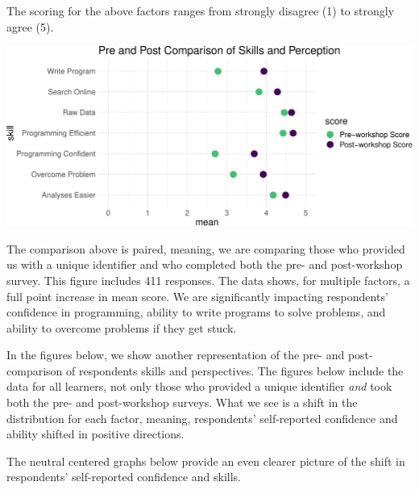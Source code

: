 \documentclass[]{article}
\makeatletter
\def\maxwidth{\ifdim\Gin@nat@width>\linewidth\linewidth\else\Gin@nat@width\fi}
\makeatother
\begin{document}
The scoring for the above factors ranges from strongly disagree (1) to
strongly agree (5).

\includegraphics[width=\maxwidth]{../figures/dc-paired-data-mean-1}

The comparison above is paired, meaning, we are comparing those who
provided us with a unique identifier and who completed both the pre- and
post-workshop survey. This figure includes 411 responses. The data
shows, for multiple factors, a full point increase in mean score. We are
significantly impacting respondents' confidence in programming, ability
to write programs to solve problems, and ability to overcome problems if
they get stuck.

In the figures below, we show another representation of the pre- and
post-comparison of respondents skills and perspectives. The figures
below include the data for all learners, not only those who provided a
unique identifier \emph{and} took both the pre- and post-workshop
surveys. What we see is a shift in the distribution for each factor,
meaning, respondents' self-reported confidence and ability shifted in
positive directions.

The neutral centered graphs below provide an even clearer picture of the
shift in respondents' self-reported confidence and skills.
\end{document}
